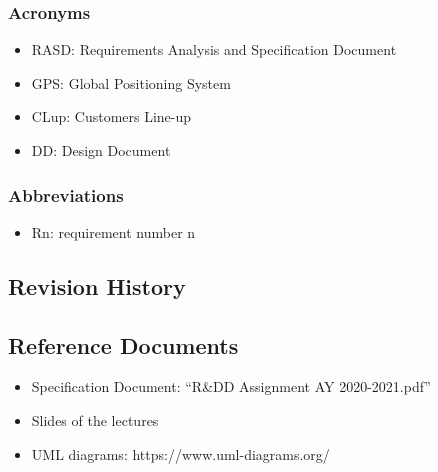 		\subsubsection{Acronyms}
		\begin{itemize}
			\item \textcolor{BrickRed}{RASD}: Requirements Analysis and Specification Document 
			\item \textcolor{BrickRed}{GPS}: Global Positioning System
			\item \textcolor{BrickRed}{CLup}: Customers Line-up
			\item \textcolor{BrickRed}{DD}: Design Document 
		\end{itemize}
		
		\subsubsection{Abbreviations}
		\begin{itemize}
			\item \textcolor{BrickRed}{Rn}: requirement number n
		\end{itemize}
		
	\subsection{Revision History}
	
	\subsection{Reference Documents}
	\begin{itemize}
			\item \textcolor{BrickRed}{Specification Document}: “R\&DD Assignment AY 2020-2021.pdf”
			\item \textcolor{BrickRed}{Slides of the lectures}
			\item \textcolor{BrickRed}{UML diagrams: https://www.uml-diagrams.org/}
	\end{itemize}
		
